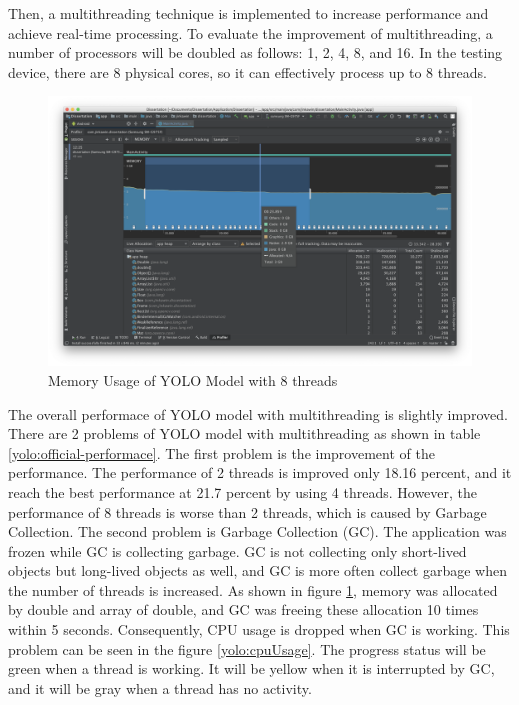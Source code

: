             Then, a multithreading technique is implemented to increase performance and achieve real-time processing.
            To evaluate the improvement of multithreading, a number of processors will be doubled as follows: 1, 2, 4, 8, and 16.
            In the testing device, there are 8 physical cores, so it can effectively process up to 8 threads.

            \begin{figure}[!ht]
                \includegraphics[width=6in]{images/chapter5/gc-problem/gc-collecting.png}
                \caption{Memory Usage of YOLO Model with 8 threads}
                \label{yolo:memoryUsage}
            \end{figure}

            The overall performace of YOLO model with multithreading is slightly improved.
            There are 2 problems of YOLO model with multithreading as shown in table \ref{yolo:official-performace}.
            The first problem is the improvement of the performance.
                The performance of 2 threads is improved only 18.16 percent, and it reach the best performance at 21.7 percent by using 4 threads.
                However, the performance of 8 threads is worse than 2 threads, which is caused by Garbage Collection.
            The second problem is Garbage Collection (GC).
                The application was frozen while GC is collecting garbage.
                GC is not collecting only short-lived objects but long-lived objects as well,
                and GC is more often collect garbage when the number of threads is increased.
                As shown in figure \ref{yolo:memoryUsage}, memory was allocated by double and array of double,
                and GC was freeing these allocation 10 times within 5 seconds.
                Consequently, CPU usage is dropped when GC is working.
                This problem can be seen in the figure \ref{yolo:cpuUsage}.
                The progress status will be green when a thread is working.
                It will be yellow when it is interrupted by GC,
                and it will be gray when a thread has no activity.

